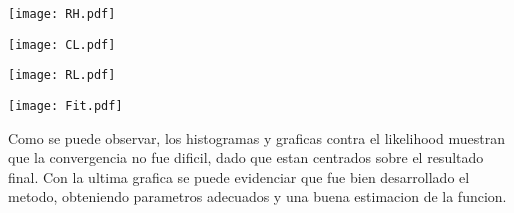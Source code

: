 \documentclass{article}
\begin{document}
\begin{center}
\texttt{[image: RH.pdf]}
\end{center}

\begin{center}
\texttt{[image: CL.pdf]}
\end{center}

\begin{center}
\texttt{[image: RL.pdf]}
\end{center}

\begin{center}
\texttt{[image: Fit.pdf]}
\end{center}

Como se puede observar, los histogramas y graficas contra el likelihood muestran que la convergencia no fue dificil, dado que estan centrados sobre el resultado final. Con la ultima grafica se puede evidenciar que fue bien desarrollado el metodo, obteniendo parametros adecuados y una buena estimacion de la funcion.
\end{document}
